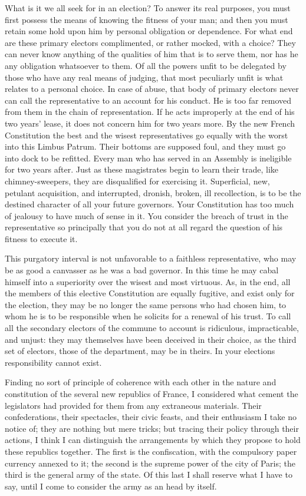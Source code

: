 What is it we all seek for in an election? To answer its real purposes, you must first possess the means of knowing the fitness of your man; and then you must retain some hold upon him by personal obligation or dependence. For what end are these primary electors complimented, or rather mocked, with a choice? They can never know anything of the qualities of him that is to serve them, nor has he any obligation whatsoever to them. Of all the powers unfit to be delegated by those who have any real means of judging, that most peculiarly unfit is what relates to a personal choice. In case of abuse, that body of primary electors never can call the representative to an account for his conduct. He is too far removed from them in the chain of representation. If he acts improperly at the end of his two years' lease, it does not concern him for two years more. By the new French Constitution the best and the wisest representatives go equally with the worst into this Limbus Patrum. Their bottoms are supposed foul, and they must go into dock to be refitted. Every man who has served in an Assembly is ineligible for two years after. Just as these magistrates begin to learn their trade, like chimney-sweepers, they are disqualified for exercising it. Superficial, new, petulant acquisition, and interrupted, dronish, broken, ill recollection, is to be the destined character of all your future governors. Your Constitution has too much of jealousy to have much of sense in it. You consider the breach of trust in the representative so principally that you do not at all regard the question of his fitness to execute it.

This purgatory interval is not unfavorable to a faithless representative, who may be as good a canvasser as he was a bad governor. In this time he may cabal himself into a superiority over the wisest and most virtuous. As, in the end, all the members of this elective Constitution are equally fugitive, and exist only for the election, they may be no longer the same persons who had chosen him, to whom he is to be responsible when he solicits for a renewal of his trust. To call all the secondary electors of the commune to account is ridiculous, impracticable, and unjust: they may themselves have been deceived in their choice, as the third set of electors, those of the department, may be in theirs. In your elections responsibility cannot exist.

Finding no sort of principle of coherence with each other in the nature and constitution of the several new republics of France, I considered what cement the legislators had provided for them from any extraneous materials. Their confederations, their spectacles, their civic feasts, and their enthusiasm I take no notice of; they are nothing but mere tricks; but tracing their policy through their actions, I think I can distinguish the arrangements by which they propose to hold these republics together. The first is the confiscation, with the compulsory paper currency annexed to it; the second is the supreme power of the city of Paris; the third is the general army of the state. Of this last I shall reserve what I have to say, until I come to consider the army as an head by itself.

